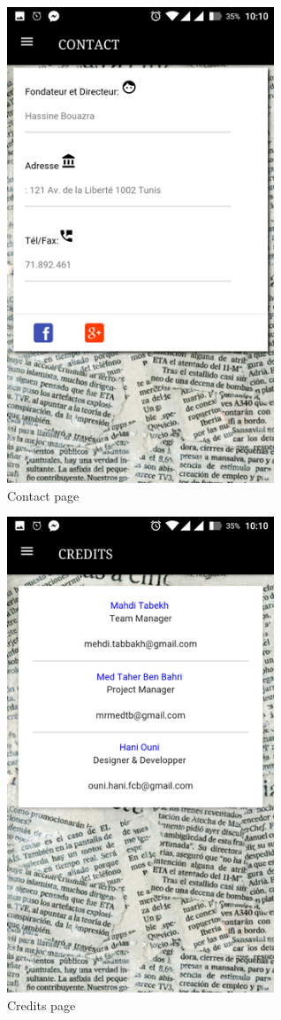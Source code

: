 \begin{figure}[H]
\centering
	\includegraphics[width=8cm]{screenshot4.png}
	\caption{Contact page}
	\label{screenshot}

\end{figure}


\begin{figure}[H]
\centering
	\includegraphics[width=8cm]{screenshot5.png}
	\caption{Credits page}
	\label{screenshot}

\end{figure}

